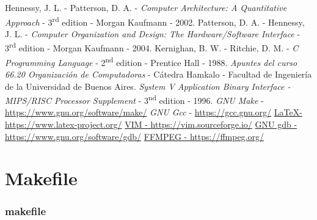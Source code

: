 \documentclass[a4paper,12pt]{article}
\numberwithin{equation}{section}
\numberwithin{figure}{section}
\begin{document}
\clearpage
\begin{thebibliography}{10}
	 Hennessy, J. L. - Patterson, D. A. - \emph{Computer Architecture: A Quantitative Approach} - 3\textsuperscript{rd} edition - Morgan Kaufmann - 2002.
	 Patterson, D. A. - Hennessy, J. L. - \emph{Computer Organization and Design: The Hardware/Software Interface} - 3\textsuperscript{rd} edition - Morgan Kaufmann - 2004.
	 Kernighan, B. W. - Ritchie, D. M. - \emph{C Programming Language} - 2\textsuperscript{nd} edition - Prentice Hall - 1988.
	 \emph{Apuntes del curso 66.20 Organización de Computadoras} - Cátedra Hamkalo - Facultad de Ingeniería de la Universidad de Buenos Aires.
	 \emph{System V Application Binary Interface - MIPS/RISC Processor Supplement} - 3\textsuperscript{nd} edition - 1996.
	 \emph{GNU Make} - \hyperlink{make}{https://www.gnu.org/software/make/}
	 \emph{GNU Gcc} - \hyperlink{gcc}{https://gcc.gnu.org/}
	\href{https://www.latex-project.org/}{\LaTeX - https://www.latex-project.org/}
	\href{https://vim.sourceforge.io/}{VIM - https://vim.sourceforge.io/}
	\href{https://www.gnu.org/software/gdb/}{GNU gdb - https://www.gnu.org/software/gdb/}
	\href{https://ffmpeg.org/}{FFMPEG - https://ffmpeg.org/}
\end{thebibliography}
\clearpage

\appendix




\section{Makefile}\label{appendix_makefile}

\subsubsection{makefile}\label{app_makefile}

\clearpage
\end{document}
